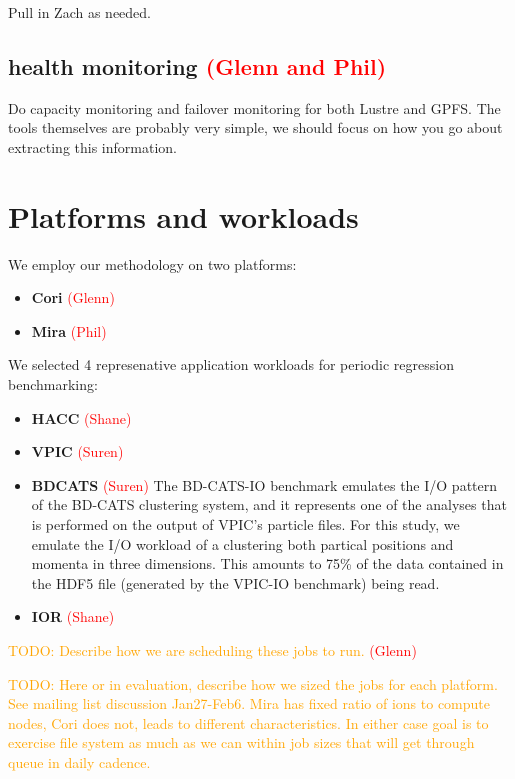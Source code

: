 \documentclass[conference,10pt,compsocconf]{IEEEtran}
\newcommand{\assign}[1]{\textcolor{red}{(#1)}}
\newcommand{\todo}[1]{\textcolor{Orange}{TODO: #1}}
\begin{document}
Pull in Zach as needed.

\subsection{health monitoring \assign{Glenn and Phil}}

Do capacity monitoring and failover monitoring for both Lustre and GPFS.  The
tools themselves are probably very simple, we should focus on how you go
about extracting this information.

\section{Platforms and workloads}

We employ our methodology on two platforms:

\begin{itemize}
\item \textbf{Cori} \assign{Glenn}
\item \textbf{Mira} \assign{Phil}
\end{itemize}

We selected 4 represenative application workloads for periodic regression
benchmarking:

\begin{itemize}
\item \textbf{HACC} \assign{Shane}
\item \textbf{VPIC} \assign{Suren} \cite{Bowers2008}
\item \textbf{BDCATS} \assign{Suren} The BD-CATS-IO benchmark emulates the I/O
pattern of the BD-CATS clustering system\cite{Patwary2015}, and it represents
one of the analyses that is performed on the output of VPIC's particle files.
For this study, we emulate the I/O workload of a clustering both partical
positions and momenta in three dimensions.  This amounts to 75\% of the data
contained in the HDF5 file (generated by the VPIC-IO benchmark) being read.
\item \textbf{IOR} \assign{Shane}
\end{itemize}

\todo{Describe how we are scheduling these jobs to run.} \assign{Glenn}

\todo{Here or in evaluation, describe how we sized the jobs for each
platform.  See mailing list discussion Jan27-Feb6.  Mira has fixed ratio of
ions to compute nodes, Cori does not, leads to different characteristics.  In
either case goal is to exercise file system as much as we can within job
sizes that will get through queue in daily cadence.}
\end{document}
